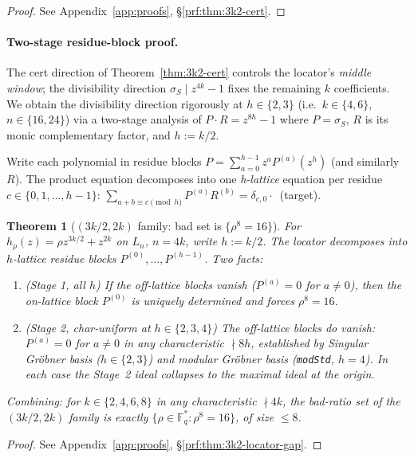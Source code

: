 \documentclass[11pt]{article}
\newtheorem{theorem}{Theorem}[section]
\theoremstyle{definition}
\theoremstyle{remark}
\newcommand{\FF}{\mathbb{F}}
\begin{document}
\begin{proof}[Proof] See Appendix~\ref{app:proofs}, \S\ref{prf:thm:3k2-cert}.\end{proof}

\paragraph{Two-stage residue-block proof.}
The cert direction of Theorem~\ref{thm:3k2-cert} controls the locator's
\emph{middle window}; the divisibility direction $\sigma_S \mid z^{4k} - 1$
fixes the remaining $k$ coefficients. We obtain the divisibility direction
rigorously at $h \in \{2, 3\}$ (i.e.\ $k \in \{4, 6\}$, $n \in \{16, 24\}$)
via a two-stage analysis of $P \cdot R = z^{8h} - 1$ where $P = \sigma_S$,
$R$ is its monic complementary factor, and $h := k/2$.

Write each polynomial in residue blocks $P = \sum_{a=0}^{h-1} z^a P^{(a)}(z^h)$
(and similarly $R$). The product equation decomposes into one
\emph{h-lattice} equation per residue $c \in \{0, 1, \ldots, h-1\}$:
$\sum_{a + b \equiv c \pmod h} P^{(a)} R^{(b)} = \delta_{c, 0} \cdot$~(target).

\begin{theorem}[$(3k/2, 2k)$ family: bad set is $\{\rho^8 = 16\}$]
\label{thm:3k2-locator-gap}
For $h_\rho(z) = \rho z^{3k/2} + z^{2k}$ on $L_n$, $n = 4k$, write
$h := k/2$. The locator decomposes into $h$-lattice residue blocks
$P^{(0)}, \ldots, P^{(h-1)}$. Two facts:
\begin{enumerate}[label=(\alph*), nosep, leftmargin=1.2em]
\item \emph{(Stage 1, all $h$)} If the off-lattice blocks vanish
($P^{(a)} = 0$ for $a \neq 0$), then the on-lattice block $P^{(0)}$
is uniquely determined and forces $\rho^8 = 16$.
\item \emph{(Stage 2, char-uniform at $h \in \{2, 3, 4\}$)} The
off-lattice blocks do vanish: $P^{(a)} = 0$ for $a \neq 0$ in any
characteristic $\nmid 8h$, established by Singular Gr\"obner basis
($h \in \{2, 3\}$) and modular Gr\"obner basis (\texttt{modStd},
$h = 4$). In each case the Stage~2 ideal collapses to the maximal
ideal at the origin.
\end{enumerate}
Combining: for $k \in \{2, 4, 6, 8\}$ in any characteristic
$\nmid 4k$, the bad-ratio set of the $(3k/2, 2k)$ family is exactly
$\{\rho \in \FF_q^* : \rho^8 = 16\}$, of size $\leq 8$.
\end{theorem}

\begin{proof}[Proof] See Appendix~\ref{app:proofs}, \S\ref{prf:thm:3k2-locator-gap}.\end{proof}
\end{document}
